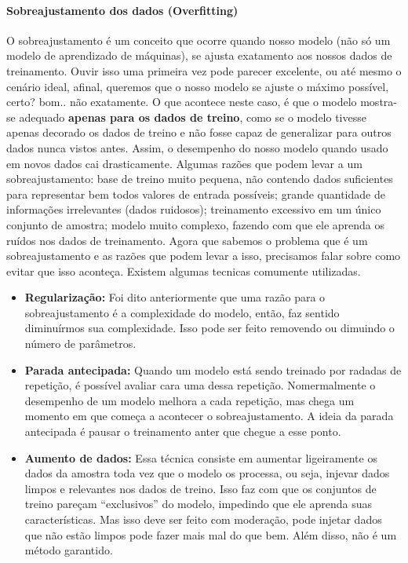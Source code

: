 \documentclass[
  letterpaper,
  DIV=11,
  numbers=noendperiod]{scrreprt}
\let\oldparagraph\paragraph
\renewcommand{\paragraph}[1]{\oldparagraph{#1}\mbox{}}
\begin{document}
\hypertarget{sobreajustamento-dos-dados-overfitting}{%
\paragraph{\texorpdfstring{Sobreajustamento dos dados
(\textbf{Overfitting})}{Sobreajustamento dos dados (Overfitting)}}\label{sobreajustamento-dos-dados-overfitting}}

O sobreajustamento é um conceito que ocorre quando nosso modelo (não só
um modelo de aprendizado de máquinas), se ajusta exatamento aos nossos
dados de treinamento. Ouvir isso uma primeira vez pode parecer
excelente, ou até mesmo o cenário ideal, afinal, queremos que o nosso
modelo se ajuste o máximo possível, certo? bom.. não exatamente. O que
acontece neste caso, é que o modelo mostra-se adequado \textbf{apenas
para os dados de treino}, como se o modelo tivesse apenas decorado os
dados de treino e não fosse capaz de generalizar para outros dados nunca
vistos antes. Assim, o desempenho do nosso modelo quando usado em novos
dados cai drasticamente. Algumas razões que podem levar a um
sobreajustamento: base de treino muito pequena, não contendo dados
suficientes para representar bem todos valores de entrada possíveis;
grande quantidade de informações irrelevantes (dados ruidosos);
treinamento excessivo em um único conjunto de amostra; modelo muito
complexo, fazendo com que ele aprenda os ruídos nos dados de
treinamento. Agora que sabemos o problema que é um sobreajustamento e as
razões que podem levar a isso, precisamos falar sobre como evitar que
isso aconteça. Existem algumas tecnicas comumente utilizadas.

\begin{itemize}
\item
  \textbf{Regularização:} Foi dito anteriormente que uma razão para o
  sobreajustamento é a complexidade do modelo, então, faz sentido
  diminuírmos sua complexidade. Isso pode ser feito removendo ou
  dimuindo o número de parâmetros.
\item
  \textbf{Parada antecipada:} Quando um modelo está sendo treinado por
  radadas de repetição, é possível avaliar cara uma dessa repetição.
  Nomermalmente o desempenho de um modelo melhora a cada repetição, mas
  chega um momento em que começa a acontecer o sobreajustamento. A ideia
  da parada antecipada é pausar o treinamento anter que chegue a esse
  ponto.
\item
  \textbf{Aumento de dados:} Essa técnica consiste em aumentar
  ligeiramente os dados da amostra toda vez que o modelo os processa, ou
  seja, injevar dados limpos e relevantes nos dados de treino. Isso faz
  com que os conjuntos de treino pareçam ``exclusivos'' do modelo,
  impedindo que ele aprenda suas características. Mas isso deve ser
  feito com moderação, pode injetar dados que não estão limpos pode
  fazer mais mal do que bem. Além disso, não é um método garantido.
\end{itemize}
\end{document}
